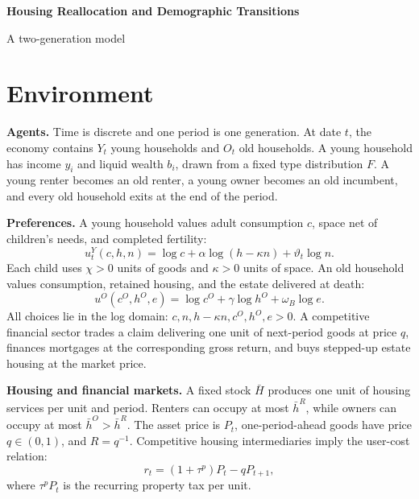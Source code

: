 \documentclass[10pt]{article}
\theoremstyle{definition}
\begin{document}
\begin{center}
{\LARGE\bfseries Housing Reallocation and Demographic Transitions}\par
\vspace{2pt}
{\large A two-generation model}\par
\end{center}

\section{Environment}

\textbf{Agents.} Time is discrete and one period is one generation. At date
$t$, the economy contains $Y_t$ young households and $O_t$ old households. A
young household has income $y_i$ and liquid wealth $b_i$, drawn from a fixed
type distribution $F$. A young renter becomes an old renter, a young owner
becomes an old incumbent, and every old household exits at the end of the
period.

\textbf{Preferences.} A young household values adult consumption $c$, space
net of children's needs, and completed fertility:
\begin{equation}
 u_t^Y(c,h,n)=\log c+\alpha\log(h-\kappa n)+\vartheta_t\log n.
 \label{eq:young_utility}
\end{equation}
Each child uses $\chi>0$ units of goods and $\kappa>0$ units of space. An old
household values consumption, retained housing, and the estate delivered at
death:
\begin{equation}
 u^O(c^O,h^O,e)=\log c^O+\gamma\log h^O+\omega_B\log e.
 \label{eq:old_utility}
\end{equation}
All choices lie in the log domain:
$c,n,h-\kappa n,c^O,h^O,e>0$. A competitive financial sector trades a claim
delivering one unit of next-period goods at price $q$, finances mortgages at
the corresponding gross return, and buys stepped-up estate housing at the
market price.

\textbf{Housing and financial markets.} A fixed stock $\bar H$ produces one
unit of housing services per unit and period. Renters can occupy at most
$\bar h^R$, while owners can occupy at most $\bar h^O>\bar h^R$. The asset
price is $P_t$, one-period-ahead goods have price $q\in(0,1)$, and
$R=q^{-1}$. Competitive housing intermediaries imply the user-cost relation:
\begin{equation}
 r_t=(1+\tau^p)P_t-qP_{t+1},
 \label{eq:user_cost}
\end{equation}
where $\tau^pP_t$ is the recurring property tax per unit.
\end{document}
